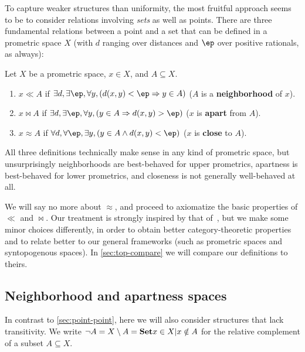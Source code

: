 \documentclass{article}
\def\cpl#1{\neg #1}
\let\implies\Rightarrow
\begin{document}
To capture weaker structures than uniformity, the most fruitful approach seems to be to consider relations involving \emph{sets} as well as points.
There are three fundamental relations between a point and a set that can be defined in a prometric space $X$ (with $d$ ranging over distances and $\ep$ over positive rationals, as always):

\begin{defn}\label{defn:toprels}
  Let $X$ be a prometric space, $x\in X$, and $A\subseteq X$.
  \begin{enumerate}
  \item $x\ll A$ if $\exists d, \exists \ep, \forall y, (d(x,y)<\ep \implies y\in A)$ ($A$ is a \textbf{neighborhood} of $x$).
  \item $x\bowtie A$ if $\exists d, \exists \ep, \forall y, (y\in A \implies d(x,y)>\ep)$ ($x$ is \textbf{apart} from $A$).
  \item $x\approx A$ if $\forall d, \forall \ep, \exists y, (y\in A \land d(x,y)<\ep)$ ($x$ is \textbf{close} to $A$).
  \end{enumerate}
\end{defn}

All three definitions technically make sense in any kind of prometric space, but unsurprisingly neighborhoods are best-behaved for upper prometrics, apartness is best-behaved for lower prometrics, and closeness is not generally well-behaved at all.

We will say no more about $\approx$, and proceed to axiomatize the basic properties of $\ll$ and $\bowtie$.
Our treatment is strongly inspired by that of~\cite{bridges-vita}, but we make some minor choices differently, in order to obtain better category-theoretic properties and to relate better to our general frameworks (such as prometric spaces and syntopogenous spaces).
In \cref{sec:top-compare} we will compare our definitions to theirs.


\subsection{Neighborhood and apartness spaces}
\label{sec:top}

In contrast to \cref{sec:point-point}, here we will also consider structures that lack transitivity.
We write $\cpl{A} = X\setminus A = \setof{x\in X | x\notin A}$ for the relative complement of a subset $A\subseteq X$.
\end{document}
